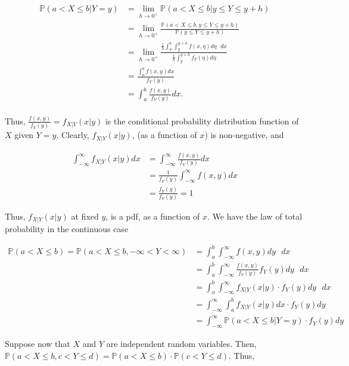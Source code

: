 \documentclass[12pt]{article}
\newcommand{\prob}[1]{\mathbb{P}(#1)}
\begin{document}
\begin{align*}
\prob{a < X \leq b \lvert Y = y} &= \lim_{h \rightarrow 0^{+}} \prob{a < X \leq b \lvert y \leq Y \leq y+h} \\
&= \lim_{h \rightarrow 0^{+}} \frac{ \prob{a < X \leq b, y \leq Y \leq y+h}}{\prob{y \leq Y \leq y+h}} \\
&= \lim_{h \rightarrow 0^{+}} \frac{ \frac{1}{h} \int_{a}^{b} \int_{y}^{y+h} f(x, \eta) d \eta \text{ } dx}{ \frac{1}{h} \int_{y}^{y+h} f_Y(\eta) d \eta } \\
&= \frac{\int_{a}^{b} f(x, y) dx }{f_Y(y)}\\
&= \int_{a}^{b} \frac{ f(x, y)}{f_Y(y)} dx. \\
\end{align*}

\noindent
Thus, $\frac{ f(x, y)}{f_Y(y)} = f_{X \lvert Y} (x \lvert y)$ is the conditional probability distribution function of $X$ given $Y=y$. Clearly, $f_{X \lvert Y} (x \lvert y)$, (as a function of $x$) is non-negative, and 

\begin{align*}
\int_{- \infty}^{\infty} f_{X \lvert Y} (x \lvert y) dx & = \int_{- \infty}^{\infty} \frac{f(x,y)}{f_Y(y)} dx \\
&= \frac{1}{f_Y(y)} \int_{- \infty}^{\infty} f(x,y) dx \\
&= \frac{f_Y(y)}{f_Y(y)} = 1 
\end{align*}

\noindent
Thus, $f_{X \lvert Y} (x \lvert y)$ at fixed $y$, is a pdf, as a function of $x$. We have the law of total probability in the continuous case

\begin{align*}
\prob{a < X \leq b } = \prob{a < X \leq b, - \infty < Y < \infty} &= \int_{a}^{b} \int_{- \infty}^{\infty} f(x,y) dy \text{ } dx \\
&= \int_{a}^{b} \int_{- \infty}^{\infty} \frac{f(x,y)}{f_Y(y)} f_Y(y) dy \text{ } dx \\
&= \int_{a}^{b} \int_{- \infty}^{\infty} f_{X \lvert Y} (x \lvert y) \cdot f_Y(y) dy \text{ } dx \\
&= \int_{- \infty}^{\infty} \int_{a}^{b} f_{X \lvert Y} (x \lvert y) dx \cdot f_Y(y) dy \\
&= \int_{- \infty}^{\infty} \prob{a < X \leq b \lvert Y = y} \cdot f_Y(y) dy
\end{align*}

\noindent
Suppose now that $X$ and $Y$ are independent random variables. Then, $\prob{a < X \leq b, c < Y \leq d} = \prob{a < X \leq b} \cdot \prob{c < Y \leq d}$. Thus,
\end{document}
